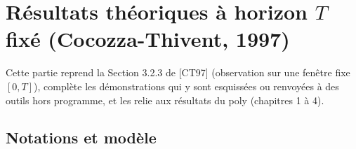 %

\theoremstyle{plain}
\newtheorem{proposition}{Proposition}
\newtheorem{theoreme}[proposition]{Théorème}
\newtheorem{lemme}[proposition]{Lemme}
\newtheorem{corollaire}[proposition]{Corollaire}
\theoremstyle{definition}
\newtheorem{definition}[proposition]{Définition}
\theoremstyle{remark}
\newtheorem{remarque}[proposition]{Remarque}

\section{Résultats théoriques à horizon $T$ fixé (Cocozza-Thivent, 1997)}\label{sec:theorie}

Cette partie reprend la Section 3.2.3 de [CT97] (observation sur une fenêtre fixe $[0,T]$), complète les démonstrations qui y sont esquissées ou renvoyées à des outils hors programme, et les relie aux résultats du poly (chapitres 1 à 4).

\subsection{Notations et modèle}\label{sec:modele}

